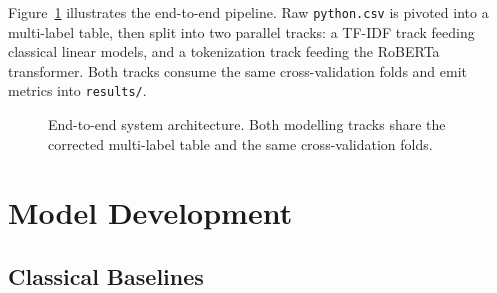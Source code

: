 \documentclass[11pt,a4paper]{article}
\begin{document}
Figure~\ref{fig:architecture} illustrates the end-to-end pipeline. Raw
\texttt{python.csv} is pivoted into a multi-label table, then split into two
parallel tracks: a TF-IDF track feeding classical linear models, and a
tokenization track feeding the RoBERTa transformer. Both tracks consume the same
cross-validation folds and emit metrics into \texttt{results/}.

\begin{figure}[H]
    \centering
    \caption{End-to-end system architecture. Both modelling tracks share the
    corrected multi-label table and the same cross-validation folds.}
    \label{fig:architecture}
\end{figure}

\section{Model Development}
\label{sec:models}

\subsection{Classical Baselines}
\end{document}
